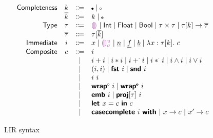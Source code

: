\documentclass[index.tex]{subfiles}
\begin{document}
\begin{figure}[htb!]
  \[\begin{array}{rccl}
    \SortNComplete & \SortNCompleteVar & \Coloneqq & \CNC \mid \CNI \\
    \SortComplete  & \SortCompleteVar  & \Coloneqq & \SortNCompleteVar \mid \CII \\
    \SortTypCon    & \SortTypConVar    & \Coloneqq & \TCHole \mid \TCInt \mid \TCFloat \mid \TCBool 
                                                   \mid \TCPair{\SortTypConVar}{\SortTypConVar} 
                                                   \mid \TCFun{\TMk{\SortTypConVar}{\SortNCompleteVar}}{\SortTypVar} \\
    \SortTyp       & \SortTypVar       & \Coloneqq & \TMk{\SortTypConVar}{\SortCompleteVar} \\
    \SortImm       & \SortImmVar       & \Coloneqq & x \mid \EEHole{\SortHoleIdVar}{\SortHoleEnvVar}
                                                   \mid \EIntLit \mid \EFloatLit \mid \EBoolLit 
                                                   \mid \EFun{x}{\TMk{\SortTypConVar}{\SortNCompleteVar}}{\SortCompVar} \\
    \SortComp      & \SortCompVar      & \Coloneqq & \SortImmVar \\
                   &                   & \mid         & \EPlus{\SortImmVar}{\SortImmVar} 
                                                   \mid \ETimes{\SortImmVar}{\SortImmVar}
                                                   \mid \EFPlus{\SortImmVar}{\SortImmVar} 
                                                   \mid \EFTimes{\SortImmVar}{\SortImmVar}
                                                   \mid \EAnd{\SortImmVar}{\SortImmVar}
                                                   \mid \EOr{\SortImmVar}{\SortImmVar} \\
                   &                   & \mid         & \EPair{\SortImmVar}{\SortImmVar}
                                                   \mid \EProjL{\SortImmVar}
                                                   \mid \EProjR{\SortImmVar} \\
                   &                   & \mid         & \EAp{\SortImmVar}{\SortImmVar} \\
                   &                   & \mid         & \EWrapIntoNI{\SortImmVar}
                                                   \mid \EWrapIntoII{\SortImmVar} \\
                   &                   & \mid         & \EEmbed{\SortImmVar}
                                                   \mid \EProj{\SortImmVar}{\SortTypConVar} \\
                   &                   & \mid         & \ELet{x}{\SortCompVar} \EInn{\SortCompVar} \\
                   &                   & \mid         & \ECaseCompleteWith{\SortImmVar}
                                                    ~\ECaseCompleteBranch{x}{\SortCompVar}
                                                    ~\ECaseCompleteBranch{x'}{\SortCompVar}
  \end{array}\]
  \caption{LIR syntax}
  \label{fig:lir-syntax}
\end{figure}
\end{document}
